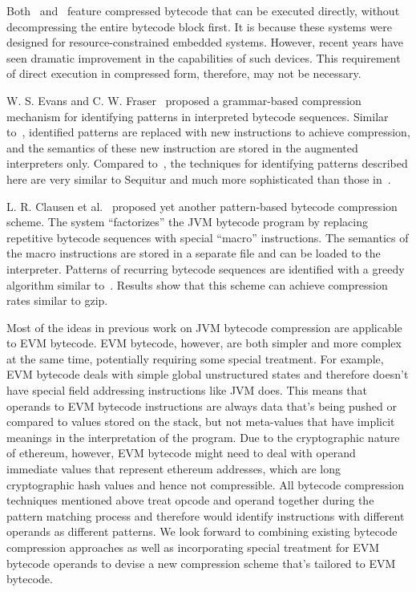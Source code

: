 Both~\cite{aslam2010} and~\cite{marc2003} feature compressed bytecode that can be executed directly, without decompressing
the entire bytecode block first. It is because these systems were designed for resource-constrained embedded systems.
However, recent years have seen dramatic improvement in the capabilities of such devices.
This requirement of direct execution in compressed form, therefore, may not be necessary.

W. S. Evans and C. W. Fraser~\cite{evans2003} proposed a grammar-based compression mechanism for identifying patterns in
interpreted bytecode sequences.
Similar to~\cite{aslam2010}, identified patterns are replaced with new instructions to achieve compression, and the semantics
of these new instruction are stored in the augmented interpreters only. Compared to~\cite{aslam2010}, the techniques for
identifying patterns described here are very similar to Sequitur and much more sophisticated than those in~\cite{aslam2010}.

L. R. Clausen et al.~\cite{clausen2000} proposed yet another pattern-based bytecode compression scheme. The system ``factorizes''
the JVM bytecode program by replacing repetitive bytecode sequences with special ``macro'' instructions. The semantics of the
macro instructions are stored in a separate file and can be loaded to the interpreter. Patterns of recurring bytecode sequences
are identified with a greedy algorithm similar to~\cite{aslam2010}. Results show that this scheme can achieve compression rates
similar to gzip.

Most of the ideas in previous work on JVM bytecode compression are applicable to EVM bytecode. EVM bytecode, however, are
both simpler and more complex at the same time, potentially requiring some special treatment. For example, EVM bytecode deals
with simple global unstructured states and therefore doesn't have special field addressing instructions like JVM does.
This means that operands to EVM bytecode instructions are always data that's being pushed or compared to values stored on
the stack, but not meta-values that have implicit meanings in the interpretation of the program.
Due to the cryptographic nature of ethereum, however, EVM bytecode might need to deal with operand immediate values that
represent ethereum addresses, which are long cryptographic hash values and hence not compressible. All bytecode compression
techniques mentioned above treat opcode and operand together during the pattern matching process and therefore would identify
instructions with different operands as different patterns.
We look forward to combining existing bytecode compression approaches as well as incorporating special treatment for EVM
bytecode operands to devise a new compression scheme that's tailored to EVM bytecode.
